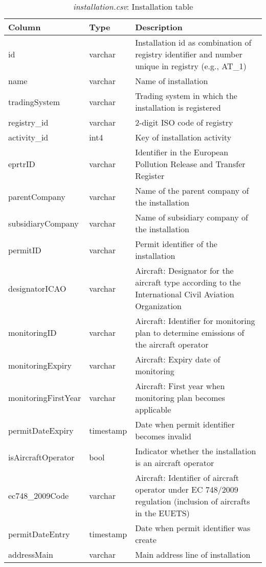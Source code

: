 \documentclass[authoryear]{elsarticle}
\begin{document}
\begin{table}[tbp]\scriptsize
	\caption{\textit{installation.csv}: Installation table}\label{tab:tbl_installation}
	\centering
	\begin{tabular*}{\textwidth}{@{}@{\extracolsep{\fill}} llp{8cm} @{}}
		\toprule
		\toprule
		\textbf{Column} & \textbf{Type}  & \textbf{Description} \\
		\midrule
		id    & varchar & Installation id as combination of registry identifier and number unique in registry (e.g., AT\_1) \\
		name  & varchar & Name of installation \\
		tradingSystem & varchar & Trading system in which the installation is registered\\
		registry\_id & varchar & 2-digit ISO code of registry  \\
		activity\_id & int4  & Key of installation activity  \\
		eprtrID & varchar & Identifier in the European Pollution Release and Transfer Register \\
		parentCompany & varchar & Name of the parent company of the installation \\
		subsidiaryCompany & varchar & Name of subsidiary company of the installation \\
		permitID & varchar & Permit identifier of the installation \\
		designatorICAO & varchar & Aircraft: Designator for the aircraft type according to the International Civil Aviation Organization \\
		monitoringID & varchar & Aircraft: Identifier for monitoring plan to determine emissions of the aircraft operator \\
		monitoringExpiry & varchar & Aircraft: Expiry date of monitoring  \\
		monitoringFirstYear & varchar & Aircraft: First year when monitoring plan becomes applicable \\
		permitDateExpiry & timestamp & Date when permit identifier becomes invalid \\
		isAircraftOperator & bool  & Indicator whether the installation is an aircraft operator \\
		ec748\_2009Code & varchar & Aircraft: Identifier of aircraft operator under EC 748/2009 regulation (inclusion of aircrafts in the EUETS) \\
		permitDateEntry & timestamp & Date when permit identifier was create \\
		addressMain & varchar & Main address line of installation \\

\end{tabular*}
\end{table}
\end{document}
